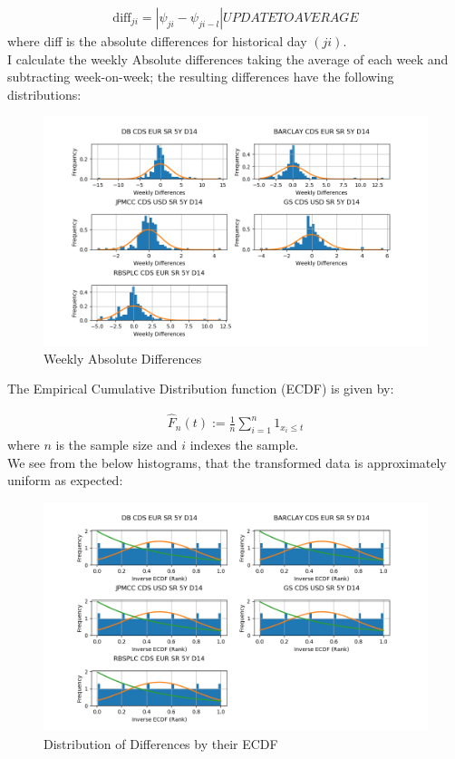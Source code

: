 \documentclass{report}
\theoremstyle{plain}
\theoremstyle{definition}
\begin{document}
\begin{align*}
\text{diff}_{ji} = |\psi_{ji} - \psi_{ji - l}| UPDATE TO AVERAGE
\end{align*}
where diff is the absolute differences for historical day $(ji)$.\\

I calculate the weekly Absolute differences taking the average of each week and subtracting week-on-week; the resulting differences have the following distributions:

\begin{figure}[H]
	\begin{center}
		\includegraphics[width=15cm]{Weekly_absolute_diffs.png}
		\caption{Weekly Absolute Differences} 
		\label{Weekly_absolute_diffs}
	\end{center}
\end{figure}

The Empirical Cumulative Distribution function (ECDF) is given by:

\begin{align*}
\hat{F}_n(t) := \frac{1}{n}\sum_{i=1}^{n}1_{x_i \leq t}
\end{align*}
where $n$ is the sample size and $i$ indexes the sample.\\

We see from the below histograms, that the transformed data is approximately uniform as expected:

\begin{figure}[H]
	\begin{center}
		\includegraphics[width=15cm]{Inverse_ECDF_Rank.png}
		\caption{Distribution of Differences by their ECDF} 
		\label{Inverse_ECDF_Rank}
	\end{center}
\end{figure}
\end{document}
